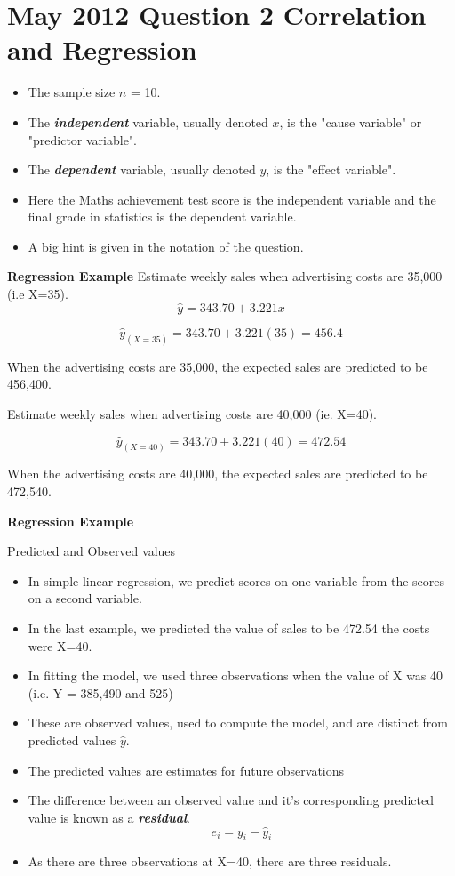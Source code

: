 \documentclass[]{report}
\begin{document}
			\section*{May 2012 Question 2 Correlation and Regression}
			\begin{itemize}
				\item The sample size $n$ = 10.
				\item The \textbf{\textit{independent}} variable, usually denoted $x$, is the "cause variable" or "predictor variable".
				\item The \textbf{\textit{dependent}} variable, usually denoted $y$, is the "effect variable".
				\item Here the Maths achievement test score is the independent variable and the final grade in statistics is the dependent variable.
				\item A big hint is given in the notation of the question.
			\end{itemize}
			

	
	
	\textbf{Regression Example}
	Estimate weekly sales when advertising costs are 35,000 (i.e X=35).
	\[ \hat{y} = 343.70 + 3.221x \]
	
	\[ \hat{y}_{(X=35)} = 343.70 + 3.221(35)  = 456.4 \]
	
	When the advertising costs are 35,000, the expected sales are predicted to be 456,400.
	
	Estimate weekly sales when advertising costs are 40,000 (ie. X=40).
	
	
	\[ \hat{y}_{(X=40)} = 343.70 + 3.221(40)  = 472.54 \]
	
	When the advertising costs are 40,000, the expected sales are predicted to be 472,540.
	
	
	\textbf{Regression Example}
	
	Predicted and Observed values
	\begin{itemize}
		\item In simple linear regression, we predict scores on one variable from the scores on a second variable.
		\item In the last example, we predicted the value of sales to be 472.54 the costs were X=40.
		\item In fitting the model, we used three observations when the value of X was 40 (i.e. Y = 385,490 and 525)
		\item These are observed values, used to compute the model, and are distinct from predicted values $\hat{y}$.
		\item The predicted values are estimates for future observations
		\item The difference between an observed value and it's corresponding predicted value is known as a \textbf{\textit{residual}}.
		\[e_i = y_i-\hat{y}_i \]
		\item As there are three observations at X=40, there are three residuals.
	\end{itemize}
	
\end{document}
